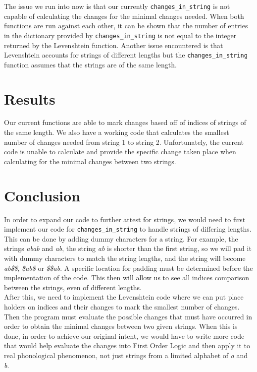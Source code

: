 \documentclass{article}
\begin{document}
The issue we run into now is that our currently \texttt{changes\_in\_string} is not capable of calculating the changes for the minimal changes needed. When both functions are run against each other, it can be shown that the number of entries in the dictionary provided by \texttt{changes\_in\_string} is not equal to the integer returned by the Levenshtein function. Another issue encountered is that Levenshtein accounts for strings of different lengths but the \texttt{changes\_in\_string} function assumes that the strings are of the same length. 


\section*{Results}

Our current functions are able to mark changes based off of indices of strings of the same length. We also have a working code that calculates the smallest number of changes needed from string 1 to string 2. Unfortunately, the current code is unable to calculate and provide the specific change taken place when calculating for the minimal changes between two strings. 

\section*{Conclusion}

In order to expand our code to further attest for strings, we would need to first implement our code for \texttt{changes\_in\_string} to handle strings of differing lengths. This can be done by adding dummy characters for a string. For example, the strings \textit{abab} and \textit{ab}, the string \textit{ab} is shorter than the first string, so we will pad it with dummy characters to match the string lengths, and the string will become \textit{ab\$\$}, \textit{\$ab\$} or \textit{\$\$ab}. A specific location for padding must be determined before the implementation of the code. This then will allow us to see all indices comparison between the strings, even of different lengths. \\

After this, we need to implement the Levenshtein code where we can put place holders on indices and their changes to mark the smallest number of changes. Then the program must evaluate the possible changes that must have occurred in order to obtain the minimal changes between two given strings. When this is done, in order to achieve our original intent, we would have to write more code that would help evaluate the changes into First Order Logic and then apply it to real phonological phenomenon, not just strings from a limited alphabet of \textit{a} and \textit{b}. \\

\printbibliography{}
\end{document}
